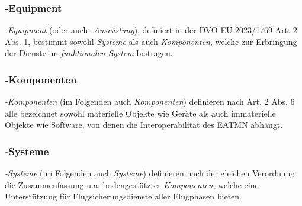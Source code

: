 
\subsubsection{\atmansf-Equipment}
    
    \textit{\atmans-Equipment} (oder auch \textit{\atmans-Ausrüstung}), definiert in der \acf{DVO} \acs{EU} 2023/1769 Art. 2 Abs. 1, bestimmt sowohl \textit{Systeme} als auch \textit{Komponenten}, welche zur Erbringung der Dienste im \textit{funktionalen System} beitragen.
    \cite[Art.2 Abs.1]{2023R1769}

\subsubsection{\atmansf-Komponenten}

    \textit{\atmans-Komponenten} (im Folgenden auch \textit{Komponenten}) definieren nach  Art. 2 Abs. 6  alle bezeichnet sowohl materielle Objekte wie Geräte als auch immaterielle Objekte wie Software, von denen die Interoperabilität des \ac{EATMN} abhängt.
    \cite[Art.2 Abs.6]{2023R1769}

\subsubsection{\atmansf-Systeme}

    \textit{\atmans-Systeme} (im Folgenden auch \textit{Systeme}) definieren nach der gleichen Verordnung die Zusammenfassung u.a. bodengestützter \textit{Komponenten}, welche eine Unterstützung für Flugsicherungsdienste aller Flugphasen bieten. 
    \cite[Art.2 Abs.7]{2023R1769}

